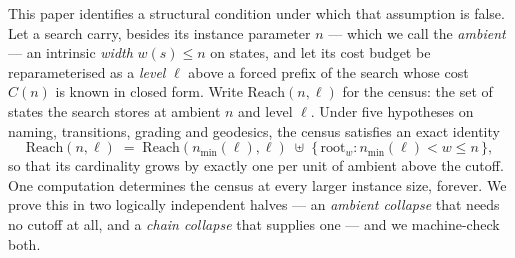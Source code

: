\documentclass[11pt,a4paper]{article}
\theoremstyle{plain}
\theoremstyle{definition}
\theoremstyle{remark}
\newcommand{\Reach}{\mathrm{Reach}}
\newcommand{\wid}{w}
\newcommand{\nmin}{n_{\min}}
\begin{document}
This paper identifies a structural condition under which that assumption is
false. Let a search carry, besides its instance parameter $n$ --- which we call
the \emph{ambient} --- an intrinsic \emph{width} $\wid(s) \le n$ on states,
and let its cost budget be reparameterised as a \emph{level} $\ell$ above a
forced prefix of the search whose cost $C(n)$ is known in closed form. Write
$\Reach(n,\ell)$ for the census: the set of states the search stores at ambient
$n$ and level $\ell$. Under five hypotheses on naming, transitions, grading and
geodesics, the census satisfies an exact identity
\[
\Reach(n,\ell)\;=\;\Reach(\nmin(\ell),\ell)\;\uplus\;
\{\,\mathrm{root}_w : \nmin(\ell) < w \le n\,\},
\]
so that its cardinality grows by exactly one per unit of ambient above the
cutoff. One computation determines the census at every larger instance size,
forever. We prove this in two logically independent halves --- an
\emph{ambient collapse} that needs no cutoff at all, and a \emph{chain
collapse} that supplies one --- and we machine-check both.
\end{document}
